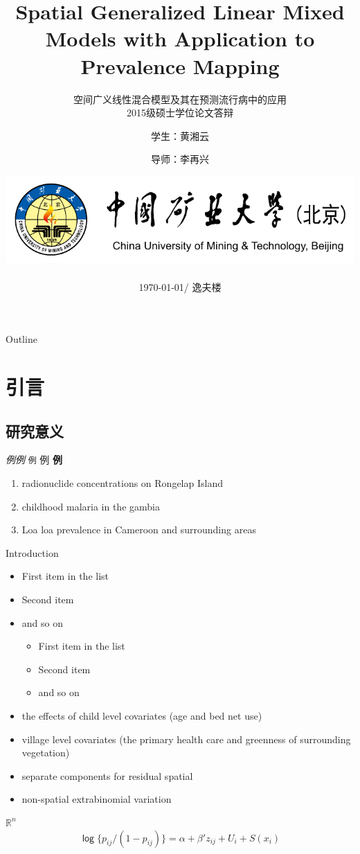 \documentclass[10pt,aspectratio=43,compress,xcolor=x11names,UTF8]{beamer}
\title[Spatial Generalized Linear Mixed Models]{Spatial Generalized Linear Mixed Models with Application to Prevalence Mapping}
\subtitle{空间广义线性混合模型及其在预测流行病中的应用\\ 2015级硕士学位论文答辩}
\author[黄湘云 \and 李再兴]{学生：黄湘云 \and 导师：李再兴}
\institute[中国矿业大学（北京）] 
{
  专业：统计学\quad 方向：数据分析与统计计算 %
}
\date[\today] %
{\includegraphics[width=38ex,interpolate=true]{cumtb} \\ ~~\\
\today / 逸夫楼}
\begin{document}
\maketitle

\begin{frame}{Outline}
\tableofcontents
\end{frame}

\section{引言}

\subsection{研究意义}

\begin{frame}{}
\emph{例}\textit{例} \texttt{例} \textsf{例} \textbf{例}
\begin{enumerate}
\item radionuclide concentrations on Rongelap Island
\item childhood malaria in the gambia
\item Loa loa prevalence in Cameroon and surrounding areas
\end{enumerate}

\end{frame}

\begin{frame}{Introduction}
\citet{Diggle2002}
\begin{itemize}
\item First item in the list
\item Second item
\item and so on
\begin{itemize}
\item First item in the list
\item Second item
\item and so on
\end{itemize}
\end{itemize}

\begin{itemize}
\item the effects of child level covariates (age and bed net use)
\item village level covariates (the primary health care and greenness of surrounding vegetation)
\item separate components for residual spatial
\item non-spatial extrabinomial variation
\end{itemize}
$\mathbb{R}^{n}$
$$ \mathsf{\log} \{p_{ij}/(1-p_{ij})\} =\alpha + \beta'z_{ij} + U_{i} + S(x_{i})$$

\end{frame}
\end{document}
